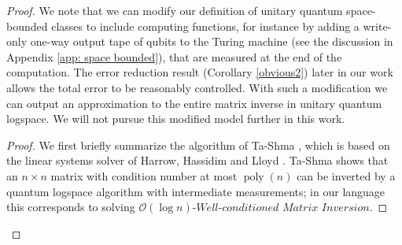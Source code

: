 \documentclass[a4paper,UKenglish]{lipics-v2016}
\newcommand\matrixinvert[1]{{\ensuremath{#1}}\textit{-Well-conditioned Matrix Inversion}}
\newcommand\bigoh{\mathcal{O}}
\DeclareMathOperator{\poly}{poly}
\begin{document}
\begin{proof}
We note that we can modify our definition of unitary quantum space-bounded classes to include computing functions, for instance by adding a write-only one-way output tape of qubits to the Turing machine (see the discussion in Appendix \ref{app: space bounded}), that are measured at the end of the computation. The error reduction result (Corollary \ref{obvious2}) later in our work allows the total error to be reasonably controlled. With such a modification we can output an approximation to the entire matrix inverse in unitary quantum logspace. We will not pursue this modified model further in this work.

\begin{proof}
We first briefly summarize the algorithm of Ta-Shma \cite{tashma}, which  is based on the linear systems solver of Harrow, Hassidim and Lloyd \cite{HHL}.  Ta-Shma shows that an $n \times n$ matrix with condition number at most $\poly(n)$ can be inverted by a quantum logspace algorithm with intermediate measurements; in our language this corresponds to solving $\matrixinvert{\bigoh(\log{n})}$. 


\end{proof}
\end{proof}
\end{document}
